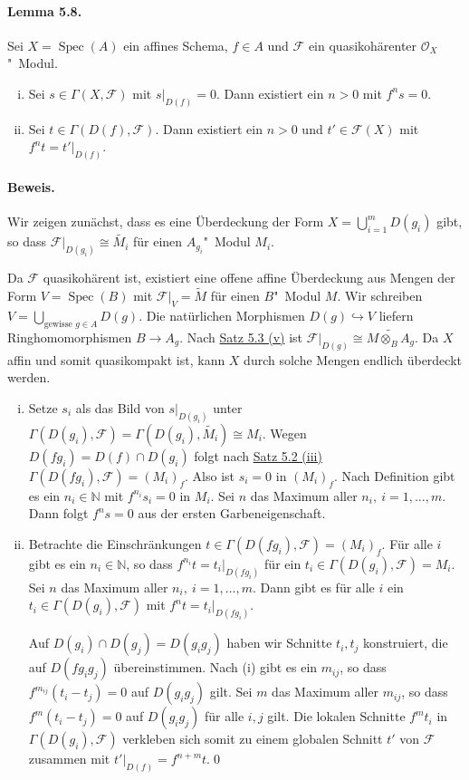 \paragraph{Lemma 5.8.}\label{5.8} Sei $X=\operatorname{Spec}(A)$ ein affines Schema, $f\in A$ und $\mathcal{F}$ ein quasikohärenter $\mathcal{O}_X$"~Modul.
\begin{enumerate}[(i)]
\item Sei $s\in\Gamma(X,\mathcal{F})$ mit $s|_{D(f)}=0$. Dann existiert ein $n>0$ mit $f^ns=0$.
\item Sei $t\in\Gamma(D(f),\mathcal{F})$. Dann existiert ein $n>0$ und $t'\in\mathcal{F}(X)$ mit $f^nt=t'|_{D(f)}$.
\end{enumerate}

\paragraph{Beweis.} Wir zeigen zunächst, dass es eine Überdeckung der Form $X=\bigcup_{i=1}^m D(g_i)$ gibt, so dass $\mathcal{F}|_{D(g_i)}\cong\widetilde{M_i}$ für einen $A_{g_i}$"~Modul $M_i$.

Da $\mathcal{F}$ quasikohärent ist, existiert eine offene affine Überdeckung aus Mengen der Form $V=\operatorname{Spec}(B)$ mit $\mathcal{F}|_V=\widetilde{M}$ für einen $B$"~Modul $M$. Wir schreiben $V=\bigcup_{\text{gewisse }g\in A}D(g)$. Die natürlichen Morphismen $D(g)\hookrightarrow V$ liefern Ringhomomorphismen $B\to A_g$. Nach \hyperref[5.3]{Satz 5.3 (v)} ist $\mathcal{F}|_{D(g)}\cong \widetilde{M\otimes_B A_g}$. Da $X$ affin und somit quasikompakt ist, kann $X$ durch solche Mengen endlich überdeckt werden.
\begin{enumerate}[(i)]
\item Setze $s_i$ als das Bild von $s|_{D(g_i)}$ unter $\Gamma(D(g_i),\mathcal{F})=\Gamma(D(g_i),\widetilde{M_i})\cong M_i$. Wegen $D(fg_i)=D(f)\cap D(g_i)$ folgt nach \hyperref[5.2]{Satz 5.2 (iii)} $\Gamma(D(fg_i),\mathcal{F})=(M_i)_f$. Also ist $s_i=0$ in $(M_i)_f$. Nach Definition gibt es ein $n_i\in\mathbb{N}$ mit $f^{n_i}s_i=0$ in $M_i$. Sei $n$ das Maximum aller $n_i,\ i=1,\ldots,m$. Dann folgt $f^ns=0$ aus der ersten Garbeneigenschaft.
\item Betrachte die Einschränkungen $t\in\Gamma(D(fg_i),\mathcal{F})=(M_i)_f$. Für alle $i$ gibt es ein $n_i\in\mathbb{N}$, so dass $f^{n_i}t=t_i|_{D(fg_i)}$ für ein $t_i\in \Gamma(D(g_i),\mathcal{F})=M_i$. Sei $n$ das Maximum aller $n_i,\ i=1,\ldots,m$. Dann gibt es für alle $i$ ein $t_i\in\Gamma(D(g_i),\mathcal{F})$ mit $f^n t = t_i|_{D(fg_i)}$.

Auf $D(g_i)\cap D(g_j)=D(g_ig_j)$ haben wir Schnitte $t_i,t_j$ konstruiert, die auf $D(fg_ig_j)$ übereinstimmen. Nach (i) gibt es ein $m_{ij}$, so dass $f^{m_{ij}}(t_i-t_j)=0$ auf $D(g_ig_j)$ gilt. Sei $m$ das Maximum aller $m_{ij}$, so dass $f^m(t_i-t_j)=0$ auf $D(g_ig_j)$ für alle $i,j$ gilt. Die lokalen Schnitte $f^mt_i$ in $\Gamma(D(g_i),\mathcal{F})$ verkleben sich somit zu einem globalen Schnitt $t'$ von $\mathcal{F}$ zusammen mit $t'|_{D(f)}=f^{n+m}t$.\qed
\end{enumerate}

